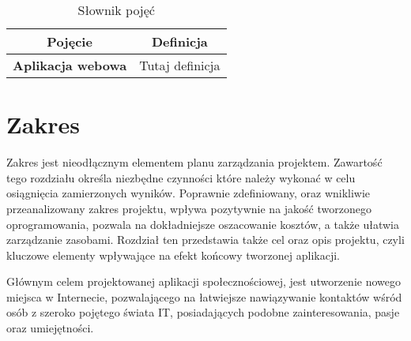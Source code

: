 \documentclass[12pt,a4paper]{article}
\begin{document}
\begin{table}[htb]
\centering
  \begin{tabular}{c|c}
  \hline
  {\bf Pojęcie} & {\bf Definicja} \\
  \hline
  \textbf{Aplikacja webowa} & Tutaj definicja\\
  \hline
  \end{tabular}
\caption{Słownik pojęć}
\label{tab:slownik}
\end{table}

\newpage

\section{Zakres}

Zakres jest nieodłącznym elementem planu zarządzania projektem. Zawartość tego rozdziału określa niezbędne czynności które należy wykonać w celu osiągnięcia zamierzonych wyników. Poprawnie zdefiniowany, oraz wnikliwie przeanalizowany zakres projektu, wpływa pozytywnie na jakość tworzonego oprogramowania, pozwala na dokładniejsze oszacowanie kosztów, a także ułatwia zarządzanie zasobami. Rozdział ten przedstawia także cel oraz opis projektu, czyli kluczowe elementy wpływające na efekt końcowy tworzonej aplikacji.  

Głównym celem projektowanej aplikacji społecznościowej, jest utworzenie nowego miejsca w Internecie, pozwalającego na łatwiejsze nawiązywanie kontaktów wśród osób z szeroko pojętego świata IT, posiadających podobne zainteresowania, pasje oraz umiejętności. 
\end{document}

